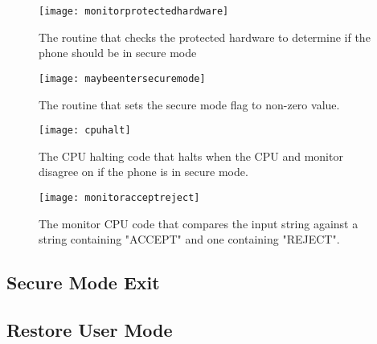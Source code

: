 \begin{figure}
  \centering
  \texttt{[image: monitorprotectedhardware]}
  \caption{The routine that checks the protected hardware to determine if the phone should be in secure mode}
  \label{fig:monitorprotectedhardware}
\end{figure}

\begin{figure}
  \centering
  \texttt{[image: maybeentersecuremode]}
  \caption{The routine that sets the secure mode flag to non-zero value.}
  \label{fig:maybeentersecuremode}
\end{figure}

\begin{figure}
  \centering
  \texttt{[image: cpuhalt]}
  \caption{The CPU halting code that halts when the CPU and monitor disagree on if the phone is in secure mode.}
  \label{fig:cpuhalt}
\end{figure}

\begin{figure}
  \centering
  \texttt{[image: monitoracceptreject]}
  \caption{The monitor CPU code that compares the input string against a string containing "ACCEPT" and one containing "REJECT".}
  \label{fig:monitoracceptreject}
\end{figure}


\subsection{Secure Mode Exit}

\label{Ch6 Sec3 Sub4}



\subsection{Restore User Mode}

\label{Ch6 Sec3 Sub5}






